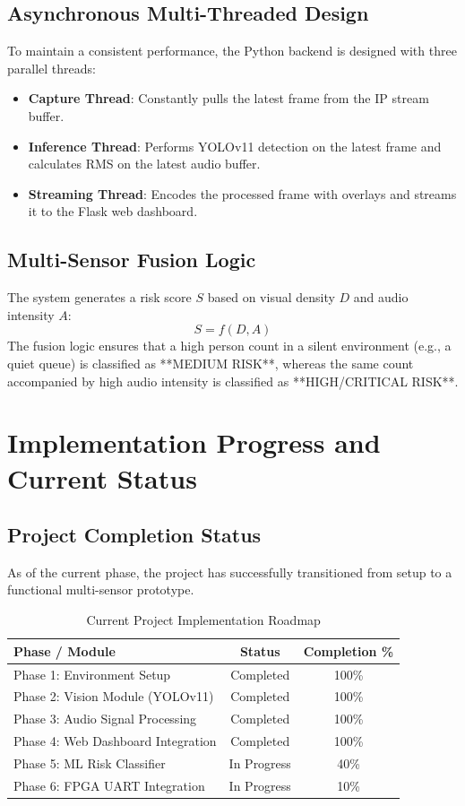 \documentclass[12pt,oneside,a4paper]{book}
\begin{document}
\section{Asynchronous Multi-Threaded Design}
To maintain a consistent performance, the Python backend is designed with three parallel threads:
\begin{itemize}
    \item \textbf{Capture Thread}: Constantly pulls the latest frame from the IP stream buffer.
    \item \textbf{Inference Thread}: Performs YOLOv11 detection on the latest frame and calculates RMS on the latest audio buffer.
    \item \textbf{Streaming Thread}: Encodes the processed frame with overlays and streams it to the Flask web dashboard.
\end{itemize}

\section{Multi-Sensor Fusion Logic}
The system generates a risk score $S$ based on visual density $D$ and audio intensity $A$:
\begin{equation}
    S = f(D, A)
\end{equation}
The fusion logic ensures that a high person count in a silent environment (e.g., a quiet queue) is classified as **MEDIUM RISK**, whereas the same count accompanied by high audio intensity is classified as **HIGH/CRITICAL RISK**.

\chapter{Implementation Progress and Current Status}

\section{Project Completion Status}
As of the current phase, the project has successfully transitioned from setup to a functional multi-sensor prototype.

\begin{table}[H]
\centering
\begin{tabular}{lcc}
\toprule
\textbf{Phase / Module} & \textbf{Status} & \textbf{Completion \%} \\
\midrule
Phase 1: Environment Setup & Completed & 100\% \\
Phase 2: Vision Module (YOLOv11) & Completed & 100\% \\
Phase 3: Audio Signal Processing & Completed & 100\% \\
Phase 4: Web Dashboard Integration & Completed & 100\% \\
Phase 5: ML Risk Classifier & In Progress & 40\% \\
Phase 6: FPGA UART Integration & In Progress & 10\% \\
\bottomrule
\end{tabular}
\caption{Current Project Implementation Roadmap}
\label{tab:status}
\end{table}
\end{document}
